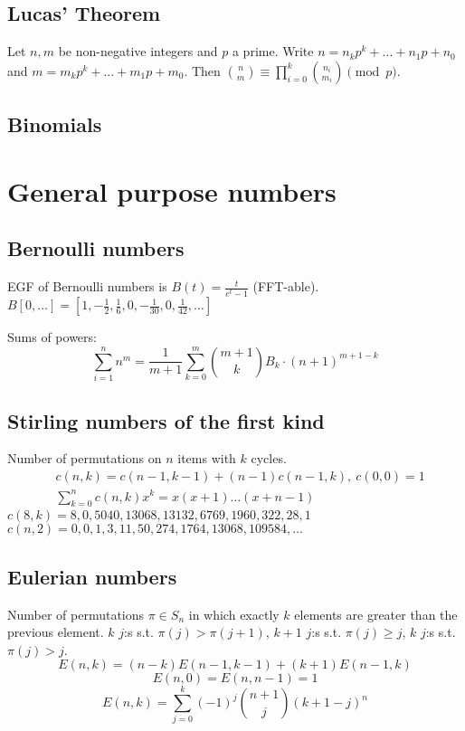 
	\subsection{Lucas' Theorem}
		Let $n,m$ be non-negative integers and $p$ a prime. Write $n=n_kp^k+...+n_1p+n_0$ and $m=m_kp^k+...+m_1p+m_0$. Then $\binom{n}{m} \equiv \prod_{i=0}^k\binom{n_i}{m_i} \pmod{p}$.

	\subsection{Binomials}

\section{General purpose numbers}
	\subsection{Bernoulli numbers}
		EGF of Bernoulli numbers is $B(t)=\frac{t}{e^t-1}$ (FFT-able).
		$B[0,\ldots] = [1, -\frac{1}{2}, \frac{1}{6}, 0, -\frac{1}{30}, 0, \frac{1}{42}, \ldots]$

		Sums of powers:
		\small
		\[ \sum_{i=1}^n n^m = \frac{1}{m+1} \sum_{k=0}^m \binom{m+1}{k} B_k \cdot (n+1)^{m+1-k} \]
		\normalsize

	\subsection{Stirling numbers of the first kind}
		Number of permutations on $n$ items with $k$ cycles.
		\begin{align*}
			&c(n,k) = c(n-1,k-1) + (n-1) c(n-1,k),\ c(0,0) = 1 \\
			&\textstyle \sum_{k=0}^n c(n,k)x^k = x(x+1) \dots (x+n-1)
		\end{align*}
		$c(8,k) = 8, 0, 5040, 13068, 13132, 6769, 1960, 322, 28, 1$ \\
		$c(n,2) = 0, 0, 1, 3, 11, 50, 274, 1764, 13068, 109584, \dots$

	\subsection{Eulerian numbers}
		Number of permutations $\pi \in S_n$ in which exactly $k$ elements are greater than the previous element. $k$ $j$:s s.t. $\pi(j)>\pi(j+1)$, $k+1$ $j$:s s.t. $\pi(j)\geq j$, $k$ $j$:s s.t. $\pi(j)>j$.
		$$E(n,k) = (n-k)E(n-1,k-1) + (k+1)E(n-1,k)$$
		$$E(n,0) = E(n,n-1) = 1$$
		$$E(n,k) = \sum_{j=0}^k(-1)^j\binom{n+1}{j}(k+1-j)^n$$

